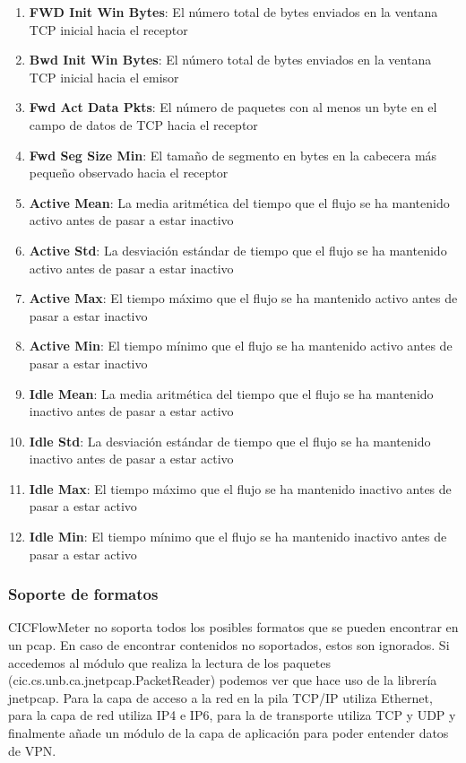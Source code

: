 \begin{enumerate}
    \item \textbf{FWD Init Win Bytes}: El número total de bytes enviados en la ventana TCP inicial hacia el receptor
    \item \textbf{Bwd Init Win Bytes}: El número total de bytes enviados en la ventana TCP inicial hacia el emisor
    \item \textbf{Fwd Act Data Pkts}: El número de paquetes con al menos un byte en el campo de datos de TCP hacia el receptor
    \item \textbf{Fwd Seg Size Min}: El tamaño de segmento en bytes en la cabecera más pequeño observado hacia el receptor
    \item \textbf{Active Mean}: La media aritmética del tiempo que el flujo se ha mantenido activo antes de pasar a estar inactivo
    \item \textbf{Active Std}: La desviación estándar de tiempo que el flujo se ha mantenido activo antes de pasar a estar inactivo
    \item \textbf{Active Max}: El tiempo máximo que el flujo se ha mantenido activo antes de pasar a estar inactivo
    \item \textbf{Active Min}: El tiempo mínimo que el flujo se ha mantenido activo antes de pasar a estar inactivo
    \item \textbf{Idle Mean}: La media aritmética del tiempo que el flujo se ha mantenido inactivo antes de pasar a estar activo
    \item \textbf{Idle Std}: La desviación estándar de tiempo que el flujo se ha mantenido inactivo antes de pasar a estar activo
    \item \textbf{Idle Max}: El tiempo máximo que el flujo se ha mantenido inactivo antes de pasar a estar activo
    \item \textbf{Idle Min}: El tiempo mínimo que el flujo se ha mantenido inactivo antes de pasar a estar activo
\end{enumerate}

\subsubsection{Soporte de formatos}

CICFlowMeter no soporta todos los posibles formatos que se pueden encontrar en un pcap. En caso de encontrar contenidos no soportados, estos son ignorados. Si accedemos al módulo que realiza la lectura de los paquetes (cic.cs.unb.ca.jnetpcap.PacketReader) podemos ver que hace uso de la librería jnetpcap. Para la capa de acceso a la red en la pila TCP/IP utiliza Ethernet, para la capa de red utiliza IP4 e IP6, para la de transporte utiliza TCP y UDP y finalmente añade un módulo de la capa de aplicación para poder entender datos de VPN. 

